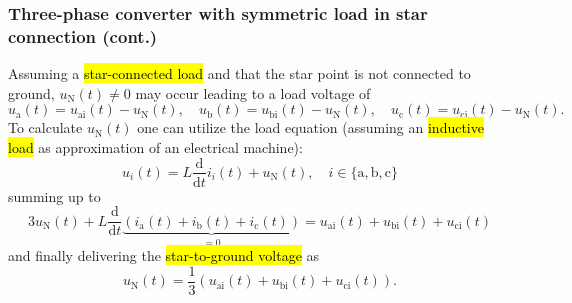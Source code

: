 \begin{frame}
    \frametitle{Three-phase converter with symmetric load in star connection (cont.)}
    Assuming a \hl{star-connected load} and that the star point is not connected to ground, $u_{\mathrm{N}}(t)\neq 0$ may occur leading to a load voltage of
    \begin{equation}
        u_{\mathrm{a}}(t) = u_{\mathrm{ai}}(t) - u_{\mathrm{N}}(t), \quad u_{\mathrm{b}}(t) = u_{\mathrm{bi}}(t) - u_{\mathrm{N}}(t), \quad u_{\mathrm{c}}(t) = u_{\mathrm{ci}}(t) - u_{\mathrm{N}}(t).
    \end{equation}\pause
    To calculate $u_{\mathrm{N}}(t)$ one can utilize the load equation (assuming an \hl{inductive load} as approximation of an electrical machine):
    \begin{equation}
        u_{i}(t) = L \frac{\mathrm{d}}{\mathrm{d}t} i_{i}(t) + u_{\mathrm{N}}(t), \quad i\in \{\mathrm{a, b, c}\}
    \end{equation}\pause
    summing up to
    \begin{equation}
        3u_{\mathrm{N}}(t) +  L \frac{\mathrm{d}}{\mathrm{d}t} \underbrace{\left(i_{\mathrm{a}}(t) + i_{\mathrm{b}}(t) + i_{\mathrm{c}}(t)\right)}_{=0} = u_{\mathrm{ai}}(t) + u_{\mathrm{bi}}(t) +u_{\mathrm{ci}}(t)
    \end{equation}\pause
    and finally delivering the \hl{star-to-ground voltage} as
    \begin{equation}
        u_{\mathrm{N}}(t) = \frac{1}{3} \left(u_{\mathrm{ai}}(t) + u_{\mathrm{bi}}(t) +u_{\mathrm{ci}}(t)\right).
    \end{equation}
\end{frame}

